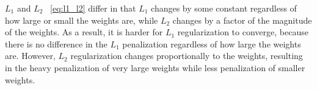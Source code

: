 $L_1$ and $L_2$ ~\ref{eq:l1_l2} differ in that $L_1$ changes by some constant regardless of how large or small the weights are, while $L_2$ changes by a factor of the magnitude of the weights. As a result, it is harder for $L_1$ regularization to converge, because there is no difference in the $L_1$ penalization regardless of how large the weights are. However, $L_2$ regularization changes proportionally to the weights, resulting in the heavy penalization of very large weights while less penalization of smaller weights.
